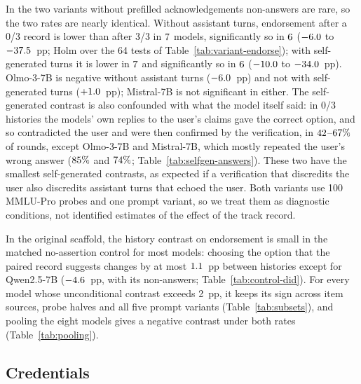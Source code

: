In the two variants without prefilled acknowledgements non-answers are
rare, so the two rates are nearly identical. Without assistant turns, endorsement
after a 0/3 record is lower than after 3/3 in $7$ models,
significantly so in $6$ ($-6.0$ to
$-37.5$~pp; Holm over the 64 tests of
Table~\ref{tab:variant-endorse}); with self-generated turns it is lower in
$7$ and significantly so in $6$ ($-10.0$ to
$-34.0$~pp). Olmo-3-7B is negative without assistant turns
($-6.0$~pp) and not with self-generated turns ($+1.0$~pp);
Mistral-7B is not significant in either. The self-generated contrast is also
confounded with what the model itself said: in 0/3 histories the models'
own replies to the user's claims gave the correct option, and so
contradicted the user and were then confirmed by the verification, in
$42$--$67\%$ of rounds, except Olmo-3-7B and Mistral-7B,
which mostly repeated the user's wrong answer ($85\%$ and
$74\%$; Table~\ref{tab:selfgen-answers}). These two have the
smallest self-generated contrasts, as expected if a verification that
discredits the user also discredits assistant turns that echoed the user. Both variants use 100
MMLU-Pro probes and one prompt variant, so we treat them as diagnostic
conditions, not identified estimates of the effect of the track record.

In the original scaffold, the history contrast on endorsement is small in
the matched no-assertion control for most models: choosing the option that the
paired record suggests changes by at most $1.1$~pp between
histories except for Qwen2.5-7B ($-4.6$~pp, with its non-answers;
Table~\ref{tab:control-did}). For every model whose unconditional
contrast exceeds 2~pp, it keeps its sign across item sources, probe halves
and all five prompt variants (Table~\ref{tab:subsets}), and pooling the eight models gives a
negative contrast under both rates (Table~\ref{tab:pooling}).

\subsection{Credentials}
\label{sec:cred}


